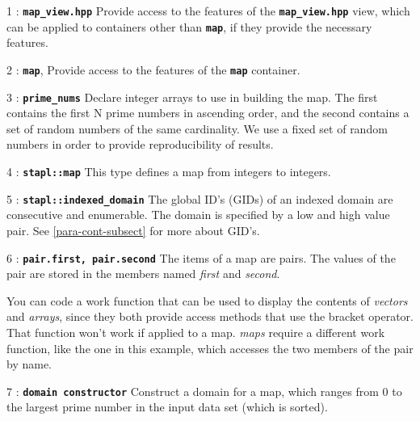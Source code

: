 \documentclass{report}
\begin{document}
\begin{hashitemize}
\item 1 : \texttt{{\bf map\_view.hpp}}
\newline
Provide access to the features of the
\texttt{{\bf map\_view.hpp}}
view, which can be applied to containers other than
\texttt{{\bf map}},
if they provide the necessary features.

\item 2 : \texttt{{\bf map}},
\newline
Provide access to the features of the
\texttt{{\bf map}}
container.

\item 3 : \texttt{{\bf prime\_nums}}
\newline
Declare integer arrays to use in building the map.  The first contains
the first N prime numbers in ascending order, and the second contains
a set of random numbers of the same cardinality.  We use a fixed set
of random numbers in order to provide reproducibility of results.

\item 4 : \texttt{{\bf stapl::map}}
\newline
This type defines a map from integers to integers.

\item 5 : \texttt{{\bf stapl::indexed\_domain}}
\newline
The global ID's (GIDs) of an indexed domain are consecutive and enumerable.
The domain is specified by a low and high value pair.  See 
\ref{para-cont-subsect} for more about GID's.

\item 6 : \texttt{{\bf pair.first, pair.second}}
\newline
The items of a map are pairs.  The values of the pair are
stored in the members named {\it first} and {\it second}.

You can code a work function that can be used to display the contents of
\emph{vectors} and \emph{arrays}, since they both provide access
methods that use the bracket operator.  That function won't work
if applied to a map.  \emph{maps} require a different work function,
like the one in this example, which accesses the two members of the pair
by name.

\item 7 : \texttt{{\bf domain constructor}}
\newline
Construct a domain for a map, which ranges from 0 to the largest
prime number in the input data set (which is sorted).


\end{hashitemize}
\end{document}
